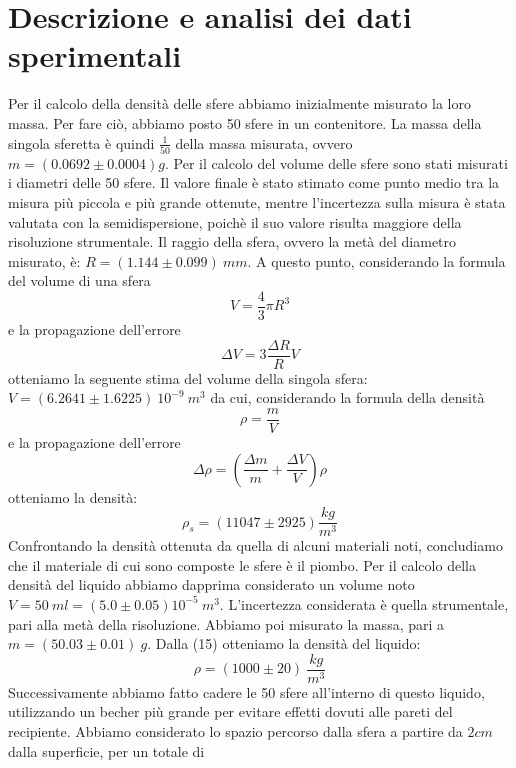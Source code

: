 \documentclass[11pt]{article}
\begin{document}
\section{Descrizione e analisi dei dati sperimentali}
Per il calcolo della densità delle sfere abbiamo inizialmente misurato la loro massa. Per fare ciò, abbiamo posto 50 sfere in un contenitore. La massa della singola sferetta è quindi $\frac{1}{50}$ della massa misurata, ovvero $m=(0.0692\pm 0.0004)g$. Per il calcolo del volume delle sfere sono stati misurati i diametri delle 50 sfere. Il valore finale è stato stimato come punto medio tra la misura più piccola e più grande ottenute, mentre l’incertezza sulla misura è stata valutata con la semidispersione, poichè il suo valore risulta maggiore della risoluzione strumentale. Il raggio della sfera, ovvero la metà del diametro misurato, è: $R=(1.144\pm 0.099)\ mm$.
A questo punto, considerando la formula del volume di una sfera
\begin{equation}
    V=\frac{4}{3}\pi R^3
\end{equation}
e la propagazione dell'errore 
\begin{equation}
    \Delta V = 3\frac{\Delta R}{R}V
\end{equation}
otteniamo la seguente stima del volume della singola sfera: $V=(6.2641\pm 1.6225)\ 10^{-9}\ m^3$ da cui, considerando la formula della densità
\begin{equation}
    \rho=\frac{m}{V}
\end{equation}
e la propagazione dell'errore
\begin{equation}
    \Delta \rho=\left(\frac{\Delta m}{m}+\frac{\Delta V}{V}\right)\rho
\end{equation}
otteniamo la densità:
\begin{equation}
   \rho_s=(11047\pm 2925)\frac{kg}{m^3} 
\end{equation}
Confrontando la densità ottenuta da quella di alcuni materiali noti, concludiamo che il materiale di cui sono composte le sfere è il piombo.
Per il calcolo della densità del liquido abbiamo dapprima considerato un volume noto $V=50\ ml = (5.0\pm 0.05) 10^{-5}\ m^3$. L'incertezza considerata è quella strumentale, pari alla metà della risoluzione.
Abbiamo poi misurato la massa, pari a $m=(50.03\pm 0.01)\ g$.
Dalla (15) otteniamo la densità del liquido:
\begin{equation}
    \rho = (1000\pm 20)\ \frac{kg}{m^3}
\end{equation}
Successivamente abbiamo fatto cadere le 50 sfere all'interno di questo liquido, utilizzando un becher più grande per evitare effetti dovuti alle pareti del recipiente. Abbiamo considerato lo spazio percorso dalla sfera a partire da $2cm$ dalla superficie, per un totale di
\end{document}
